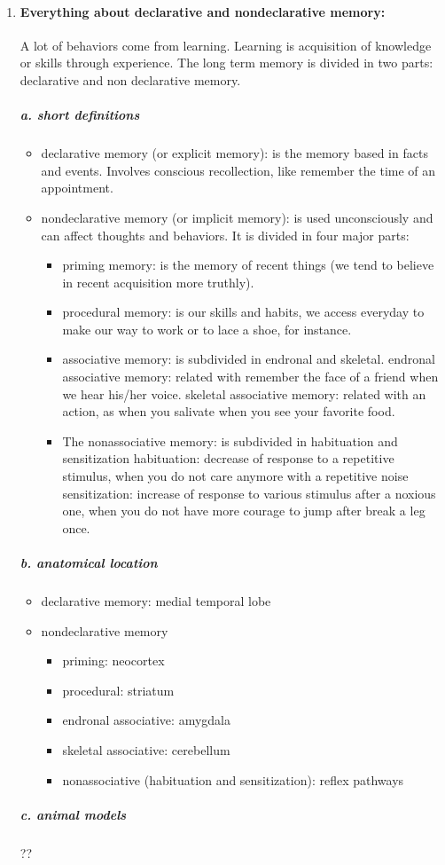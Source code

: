 \documentclass[12pt,article,oneside,a4paper]{memoir}
\begin{document}
\begin{enumerate}
\item \paragraph{Everything about declarative and nondeclarative memory:}
A lot of behaviors come from learning. Learning is acquisition of knowledge or skills through experience. The long term memory is divided in two parts: declarative and non declarative memory.
\subparagraph{a. short definitions}
\begin{itemize}
\item declarative memory (or explicit memory): is the memory based in facts and events. Involves conscious recollection, like remember the time of an appointment.
\item nondeclarative memory (or implicit memory): is used unconsciously and can affect thoughts and behaviors. It is divided in four major parts: 
\begin{itemize}
\item priming memory: is the memory of recent things (we tend to believe in recent acquisition more truthly).
\item procedural memory: is our skills and habits, we access everyday to make our way to work or to lace a shoe, for instance.
\item associative memory: is subdivided in endronal and skeletal.
\subitem endronal associative memory: related with remember the face of a friend when we hear his/her voice.
\subitem skeletal associative memory: related with an action, as when you salivate when you see your favorite food.
\item The nonassociative memory: is subdivided in habituation and sensitization
\subitem habituation: decrease of response to a repetitive stimulus, when you do not care anymore with a repetitive noise
\subitem sensitization: increase of response to various stimulus after a noxious one, when you do not have more courage to jump after break a leg once.
\end{itemize} 
\end{itemize}
\subparagraph{b. anatomical location}
\begin{itemize}
\item declarative memory: medial temporal lobe
\item nondeclarative memory
\begin{itemize}
\item priming: neocortex
\item procedural: striatum
\item endronal associative: amygdala
\item skeletal associative: cerebellum
\item nonassociative (habituation and sensitization): reflex pathways
\end{itemize}
\end{itemize}
\subparagraph{c. animal models} ??


\end{enumerate}
\end{document}
